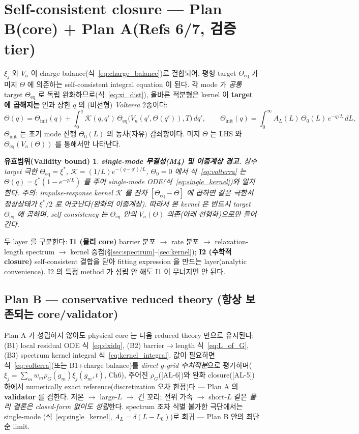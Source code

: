 \documentclass[11pt,a4paper]{article}
\newtheorem*{boundbox}{유효범위(Validity bound)}
\newcommand{\eq}{\mathrm{eq}}
\newcommand{\AL}[1]{\textsf{[AL-#1]}}
\begin{document}
\section{Self-consistent closure — Plan B(core) + Plan A(Refs 6/7, 검증 tier)}\label{sec:closure}
$\xi_j$ 와 $V_n$ 이 charge balance(식~\eqref{eq:charge_balance})로 결합되어, 평형 target $\Theta_\eq$ 가
미지 $\Theta$ 에 의존하는 self-consistent integral equation 이 된다. 각 mode 가 \emph{공통} target
$\Theta_\eq$ 로 독립 완화하므로(식~\eqref{eq:xi_dist}), 올바른 적분형은 kernel 이 \textbf{target 에
곱해지는} 인과 상한 $q$ 의 (비선형) \emph{Volterra} 2종이다:
\begin{equation}
\Theta(q)=\Theta_\mathrm{init}(q)+\int_0^q \mathcal K(q,q')\,\Theta_\eq\big(V_n(q',\Theta(q')),T\big)\,dq',
\qquad \Theta_\mathrm{init}(q)=\int_0^\infty A_L(L)\,\Theta_0(L)\,e^{-q/L}\,dL,
\label{eq:volterra}
\end{equation}
$\Theta_\mathrm{init}$ 는 초기 mode 진행 $\Theta_0(L)$ 의 동차(자유) 감쇠항이다. 미지 $\Theta$ 는 LHS 와
$\Theta_\eq(V_n(\Theta))$ 를 통해서만 나타난다.
\begin{boundbox}
\textbf{single-mode 무결성(M4) 및 이중계상 경고.} 상수 target 극한 $\Theta_\eq=\xi^\ast$,
$\mathcal K=(1/L)e^{-(q-q')/L}$, $\Theta_0=0$ 에서 식~\eqref{eq:volterra} 는
$\Theta(q)=\xi^\ast(1-e^{-q/L})$ 를 주어 single-mode ODE(식~\eqref{eq:single_kernel})와 일치한다.
\emph{주의}: impulse-response kernel $\mathcal K$ 를 잔차 $[\Theta_\eq-\Theta]$ 에 곱하면 같은 극한서
정상상태가 $\xi^\ast/2$ 로 어긋난다(완화의 이중계상). 따라서 본 kernel 은 반드시 target $\Theta_\eq$ 에
곱하며, self-consistency 는 $\Theta_\eq$ 안의 $V_n(\Theta)$ 의존(아래 선형화)으로만 들어간다.
\end{boundbox}
두 layer 를 구분한다: \textbf{I1 (물리 core)} barrier 분포 $\to$ rate 분포 $\to$ relaxation-length
spectrum $\to$ kernel 중첩(\S\ref{sec:spectrum}--\ref{sec:kernel}); \textbf{I2 (수학적 closure)}
self-consistent 결합을 닫아 fitting expression 을 만드는 layer(analytic convenience). I2 의 특정 method 가
성립 안 해도 I1 이 무너지면 안 된다.

\subsection{Plan B — conservative reduced theory (항상 보존되는 core/validator)}\label{sec:planB}
Plan A 가 성립하지 않아도 physical core 는 다음 reduced theory 만으로 유지된다: (B1) local residual
ODE 식~\eqref{eq:dxidq}, (B2) barrier$\to$length 식~\eqref{eq:L_of_G}, (B3) spectrum kernel integral
식~\eqref{eq:kernel_integral}. 값이 필요하면 식~\eqref{eq:volterra}(또는 B1+charge balance)를
\emph{direct $g$-grid 수치적분}으로 평가하며($\xi_j=\sum_m w_m\rho_G(g_m)\xi_j(g_m,t)$, Ch6), 주어진
$\rho_G$(\AL{6})와 완화 closure(\AL{5}) 하에서 numerically exact reference(discretization 오차 한정)다 —
Plan A 의 \textbf{validator} 를 겸한다. 저온 $\to$ large-$L$ $\to$ 긴 꼬리; 전위 가속 $\to$ short-$L$
같은 \emph{물리 결론은 closed-form 없이도 성립}한다. spectrum 조차 식별 불가한 극단에서는 single-mode
(식~\eqref{eq:single_kernel}, $A_L=\delta(L-L_0)$)로 회귀 — Plan B 안의 최단순 limit.
\end{document}
